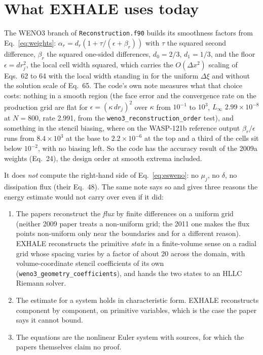 \documentclass[english,a4paper]{my_memo}
\begin{document}
\section{What EXHALE uses today}

The WENO3 branch of \texttt{Reconstruction.f90} builds its smoothness
factors from Eq.~\eqref{eq:weights}: $\alpha_r = d_r(1 + \tau/(\epsilon +
\beta_r))$ with $\tau$ the squared second difference, $\beta_r$ the squared
one-sided differences, $d_0 = 2/3$, $d_1 = 1/3$, and the floor
$\epsilon = dr_j^2$, the local cell width squared, which carries the
$O(\Delta x^2)$ scaling of Eqs.~62 to 64 with the local width standing in for
the uniform $\Delta\xi$ and without the solution scale of Eq.~65. The code's
own note measures what that choice costs: nothing in a smooth region (the
face error and the convergence rate on the production grid are flat for
$\epsilon = (\kappa\, dr_j)^2$ over $\kappa$ from $10^{-1}$ to $10^{3}$,
$L_\infty$ $2.99\times10^{-8}$ at $N = 800$, rate 2.991, from the
\texttt{weno3\_reconstruction\_order} test), and something in the stencil
biasing, where on the WASP-121b reference output $\beta_r/\epsilon$ runs from
$8.4\times10^{3}$ at the base to $2.2\times10^{-6}$ at the top and a third of
the cells sit below $10^{-2}$, with no biasing left. So the code has the
accuracy result of the 2009a weights (Eq.~24), the design order at smooth
extrema included.

It does \emph{not} compute the right-hand side of Eq.~\eqref{eq:esweno}: no
$\mu_j$, no $\delta$, no dissipation flux (their Eq.~48). The same note says
so and gives three reasons the energy estimate would not carry over even if
it did:
\begin{enumerate}
\item The papers reconstruct the \emph{flux} by finite differences on a
  uniform grid (neither 2009 paper treats a non-uniform grid; the 2011 one
  makes the flux points non-uniform only near the boundaries and for a
  different reason). EXHALE reconstructs the primitive \emph{state} in a
  finite-volume sense on a radial grid whose spacing varies by a factor of
  about 20 across the domain, with volume-coordinate stencil coefficients of
  its own (\texttt{weno3\_geometry\_coefficients}), and hands the two states
  to an HLLC Riemann solver.
\item The estimate for a system holds in characteristic form. EXHALE
  reconstructs component by component, on primitive variables, which is the
  case the paper says it cannot bound.
\item The equations are the nonlinear Euler system with sources, for which
  the papers themselves claim no proof.
\end{enumerate}
\end{document}
